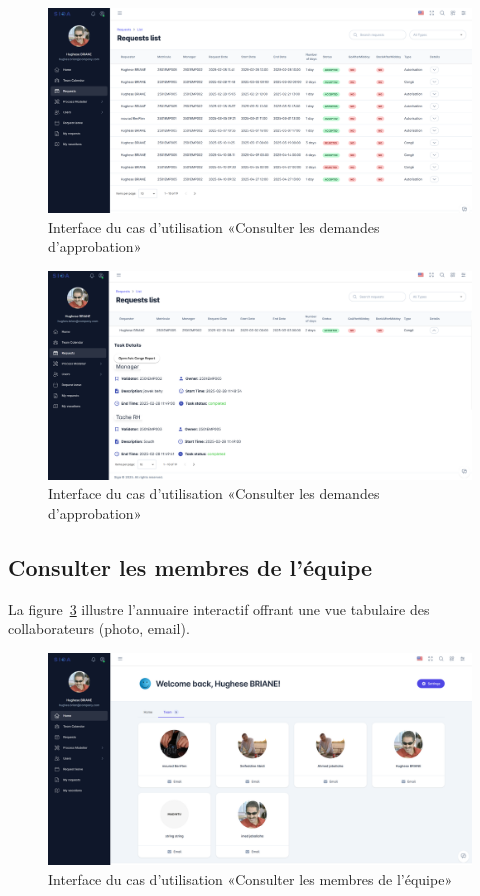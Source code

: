 \begin{figure}[h]
    \centering
    \includegraphics[width=16cm]{images/realisation/req1.png}
    \caption{Interface du cas d'utilisation «Consulter les demandes d’approbation»}
    \label{fig:demandes}
\end{figure}
\begin{figure}[h]
    \centering
    \includegraphics[width=16cm]{images/realisation/req2.png}
    \caption{Interface du cas d'utilisation «Consulter les demandes d’approbation»}
    \label{fig:demandes2}
\end{figure}    
\clearpage
\subsection{Consulter les membres de l’équipe}
La figure~\ref{fig:equipe} illustre l'annuaire interactif offrant une vue tabulaire des collaborateurs (photo, email).
\begin{figure}[h]
    \centering
    \includegraphics[width=16cm]{images/realisation/cme.png}
    \caption{Interface du cas d'utilisation «Consulter les membres de l’équipe»}
    \label{fig:equipe}
\end{figure}
